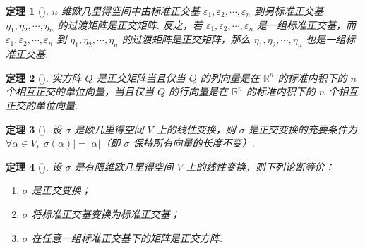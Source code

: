 \documentclass[zihao=-4,UTF8,linespread=1.8,nothm]{aytony_base}
\newtheorem{theorem}{\indent 定理}[subsection]
\begin{document}
\begin{theorem}[]
    $n$ 维欧几里得空间中由标准正交基 ${\varepsilon}_1, {\varepsilon}_2, \cdots, {\varepsilon}_{n}$ 到另标准正交基 ${\eta}_1, {\eta}_2, \cdots, {\eta}_{n}$ 的过渡矩阵是正交矩阵. 反之，若 ${\varepsilon}_1, {\varepsilon}_2, \cdots, {\varepsilon}_{n}$ 是一组标准正交基，而 ${\varepsilon}_1, {\varepsilon}_2, \cdots, {\varepsilon}_{n}$ 到 ${\eta}_1, {\eta}_2, \cdots, {\eta}_{n}$ 的过渡矩阵是正交矩阵，那么 ${\eta}_1, {\eta}_2, \cdots, {\eta}_{n}$ 也是一组标准正交基.
\end{theorem}

\begin{theorem}[]
    实方阵 $Q$ 是正交矩阵当且仅当 $Q$ 的列向量是在 $\mathbb{R}^n$ 的标准内积下的 $n$ 个相互正交的单位向量，当且仅当 $Q$ 的行向量是在 $\mathbb{R}^n$ 的标准内积下的 $n$ 个相互正交的单位向量.
\end{theorem}

\begin{theorem}[]
    设 $\sigma$ 是欧几里得空间 $V$ 上的线性变换，则 $\sigma$ 是正交变换的充要条件为 $\forall \alpha \in V, |\sigma(\alpha)| = |\alpha|$（即 $\sigma$ 保持所有向量的长度不变）.
\end{theorem}

\begin{theorem}[]
    设 $\sigma$ 是有限维欧几里得空间 $V$ 上的线性变换，则下列论断等价：
    \begin{enumerate}[nosep]
        \item $\sigma$ 是正交变换；
        \item $\sigma$ 将标准正交基变换为标准正交基；
        \item $\sigma$ 在任意一组标准正交基下的矩阵是正交方阵.
    \end{enumerate}
\end{theorem}
\end{document}
